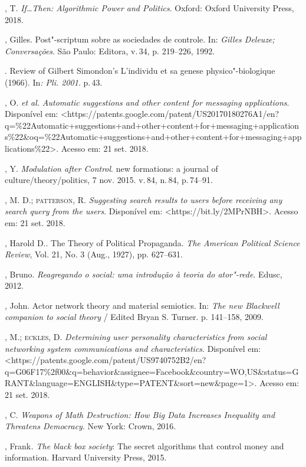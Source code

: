 \begin{bibliohedra}
, T. \emph{If\ldots{}Then: Algorithmic Power and Politics}. Oxford:
Oxford University Press, 2018.

, Gilles. Post"-scriptum sobre as sociedades de controle. In:
\emph{Gilles Deleuze; Conversações}. São Paulo: Editora, v.\,34, p.
219--226, 1992.

\titidem. Review of Gilbert Simondon's L'individu et sa
genese physico"-biologique (1966). In\emph{: Pli. 2001}. p.\,43.

, O. \emph{et al.} \emph{Automatic suggestions and other
content for messaging applications}. Disponível em:
\textless{}https://patents.google.com/patent/US20170180276A1/en?q=\%22Automatic+suggestions+and+other+content+for+messaging+applications\%22\&oq=\%22Automatic+suggestions+and+other+content+for+messaging+applications\%22\textgreater{}.
Acesso em: 21 set. 2018.

, Y. \emph{Modulation after Control}. new formations: a journal of
culture/theory/politics, 7 nov. 2015. v.\,84, n.\,84, p.\,74--91.

, M. D.; \textsc{patterson}, R. \emph{Suggesting search results to users
before receiving any search query from the users}. Disponível em:
\textless{}https://bit.ly/2MPrNBH\textgreater{}.
Acesso em: 21 set. 2018.

, Harold D.. The Theory of Political Propaganda. \emph{The
American Political Science Review}, Vol. 21, No. 3 (Aug., 1927), pp.
627--631.

, Bruno. \emph{Reagregando o social: uma introdução à teoria do
ator"-rede}. Edusc, 2012.

, John. Actor network theory and material semiotics. In: \emph{The
new Blackwell companion to social theory} / Edited Bryan S. Turner. p.
141--158, 2009.

, M.; \textsc{eckles}, D. \emph{Determining user personality
characteristics from social networking system communications and
characteristics}. Disponível em:
\textless{}https://patents.google.com/patent/US9740752B2/en?q=G06F17\%2f00\&q=behavior\&assignee=Facebook\&country=WO,US\&status=GRANT\&language=ENGLISH\&type=PATENT\&sort=new\&page=1\textgreater{}.
Acesso em: 21 set. 2018.

, C. \emph{Weapons of Math Destruction: How Big Data Increases
Inequality and Threatens Democracy}. New York: Crown, 2016.

, Frank\emph{. The black box society}: The secret algorithms
that control money and information. Harvard University Press, 2015.


\end{bibliohedra}
